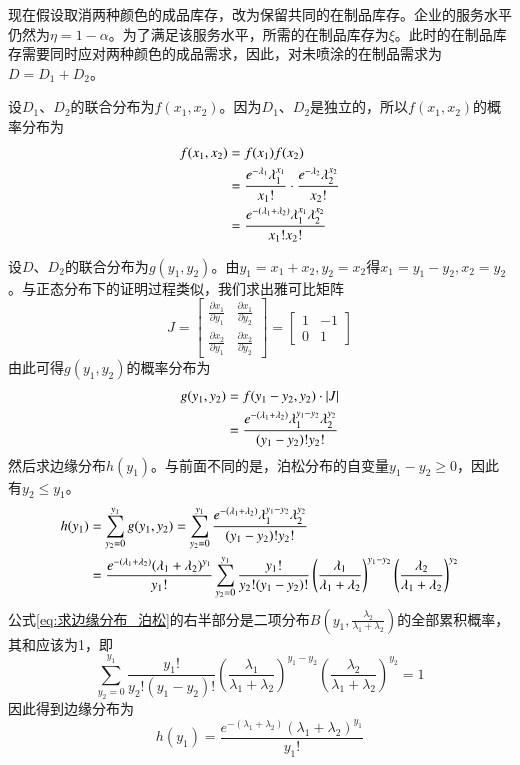 现在假设取消两种颜色的成品库存，改为保留共同的在制品库存。企业的服务水平仍然为$\eta=1-\alpha$。为了满足该服务水平，所需的在制品库存为$\xi$。此时的在制品库存需要同时应对两种颜色的成品需求，因此，对未喷涂的在制品需求为$D=D_1+D_2$。

设$D_1$、$D_2$的联合分布为$f(x_1,x_2)$。因为$D_1$、$D_2$是独立的，所以$f(x_1,x_2)$的概率分布为
\begin{align}
f(x_1,x_2) &= f(x_1)f(x_2) \notag\\
&= \frac{e^{-\lambda_1}\lambda_1^{x_1}}{x_1!} \cdot \frac{e^{-\lambda_2}\lambda_2^{x_2}}{x_2!} \notag\\
&= \frac{e^{-(\lambda_1+\lambda_2)}\lambda_1^{x_1}\lambda_2^{x_2}}{x_1!x_2!}
\label{eq:联合分布_泊松}
\end{align}

设$D$、$D_2$的联合分布为$g(y_1,y_2)$。由$y_1=x_1+x_2,y_2=x_2$得$x_1=y_1-y_2,x_2=y_2$。与正态分布下的证明过程类似，我们求出雅可比矩阵
\[
J = \begin{bmatrix}
\frac{\partial x_1}{\partial y_1} & \frac{\partial x_1}{\partial y_2} \\
\frac{\partial x_2}{\partial y_1} & \frac{\partial x_2}{\partial y_2}
\end{bmatrix} = \begin{bmatrix}
1 & -1 \\
0 & 1
\end{bmatrix}
\]
由此可得$g(y_1,y_2)$的概率分布为
\begin{align}
g(y_1,y_2) &= f(y_1-y_2,y_2)\cdot\left|J\right| \notag\\
&= \frac{e^{-(\lambda_1+\lambda_2)}\lambda_1^{y_1-y_2}\lambda_2^{y_2}}{(y_1-y_2)!y_2!}
\label{eq:新联合分布_泊松}
\end{align}
然后求边缘分布$h(y_1)$。与前面不同的是，泊松分布的自变量$y_1-y_2\geq 0$，因此有$y_2\leq y_1$。
\begin{align}
h(y_1) &= \sum_{y_2=0}^{y_1}g(y_1,y_2) = \sum_{y_2=0}^{y_1}\frac{e^{-(\lambda_1+\lambda_2)}\lambda_1^{y_1-y_2}\lambda_2^{y_2}}{(y_1-y_2)!y_2!} \notag\\
&= \frac{e^{-(\lambda_1+\lambda_2)}(\lambda_1+\lambda_2)^{y_1}}{y_1!}\sum_{y_2=0}^{y_1}\frac{y_1!}{y_2!(y_1-y_2)!}\left(\frac{\lambda_1}{\lambda_1+\lambda_2}\right)^{y_1-y_2}\left(\frac{\lambda_2}{\lambda_1+\lambda_2}\right)^{y_2}
\label{eq:求边缘分布_泊松}
\end{align}
公式\ref{eq:求边缘分布_泊松}的右半部分是二项分布$B(y_1,\frac{\lambda_2}{\lambda_1+\lambda_2})$的全部累积概率，其和应该为1，即
\[
\sum_{y_2=0}^{y_1}\frac{y_1!}{y_2!(y_1-y_2)!}\left(\frac{\lambda_1}{\lambda_1+\lambda_2}\right)^{y_1-y_2}\left(\frac{\lambda_2}{\lambda_1+\lambda_2}\right)^{y_2} = 1
\]
因此得到边缘分布为
\begin{equation}
h(y_1) = \frac{e^{-(\lambda_1+\lambda_2)}(\lambda_1+\lambda_2)^{y_1}}{y_1!}
\label{eq:边缘分布结果_泊松}
\end{equation}

